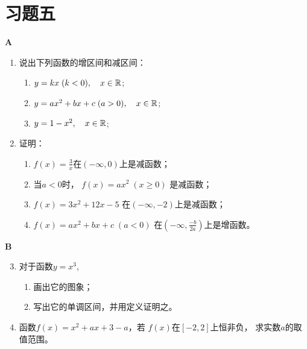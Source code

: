 \section*{习题五}
\begin{center}
\bfseries A
\end{center}

\begin{enumerate}
    \item 说出下列函数的增区间和减区间：
\begin{enumerate}[(1)]
    \item $y=kx\; (k<0),\quad x\in\mathbb{R}$;
    \item $y=ax^2+bx+c\; (a>0),\quad x\in\mathbb{R}$;
    \item $y=1-x^2,\quad x\in\mathbb{R}$;
\end{enumerate}
    \item 证明：
\begin{enumerate}[(1)]
    \item $f(x)=\frac{3}{x}$在$(-\infty,0)$上是减函数；
    \item 当$a<0$时， $f(x)=ax^2\; (x\ge 0)$
    是减函数；
 \item $f(x)=3x^2+12x-5$
    在$(-\infty,-2)$上是减函数；
 \item $f(x)=ax^2+bx+c\; (a<0)$   在$\left(-\infty,\frac{-b}{2a}\right)$上是增函数。
\end{enumerate}
\end{enumerate}


\begin{center}
\bfseries B
\end{center}

\begin{enumerate}\setcounter{enumi}{2}
    \item 对于函数$y=x^3$,
\begin{enumerate}[(1)]
\item 画出它的图象；
\item 写出它的单调区间，并用定义证明之。
\end{enumerate}

\item 函数$f(x)=x^2+ax+3-a$，若
$f(x)$在$[-2,2]$上恒非负，
求实数$a$的取值范围。
\end{enumerate}


